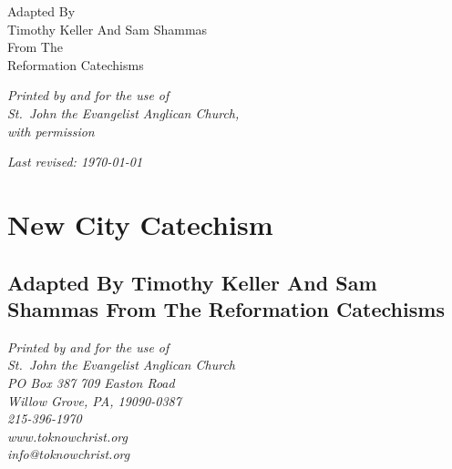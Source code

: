 \documentclass[00-main.tex]{subfiles}
\begin{document}



\pagestyle{empty}

\vfill

\begin{center}

	{\Huge{}}

\end{center}

\vfill

\begin{center}
	Adapted By\\Timothy Keller And Sam Shammas\\From The\\Reformation Catechisms
\end{center}

\vfill

\begin{center}


	{\em Printed by and for the use of\\ St.\ John the Evangelist Anglican Church,\\ with permission}


\end{center}

\vfill

\begin{center}
\scriptsize\em Last revised: \today{}
\end{center}



\cleardoublepage

\pagestyle{plain}

\chapter*{New City Catechism}

\section*{Adapted By Timothy Keller And Sam Shammas From The Reformation Catechisms}

\begin{center}
\emph{Printed by and for the use of\\
St.\ John the Evangelist Anglican Church\\
PO Box 387\,\textbullet\,709 Easton Road\\
Willow Grove, PA, 19090-0387\\
215-396-1970\\
www.toknowchrist.org\\
info@toknowchrist.org}
\end{center}
\end{document}
